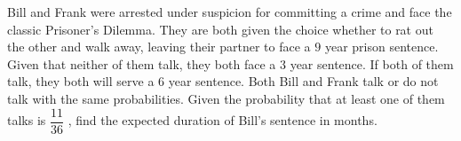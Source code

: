 Bill and Frank were arrested under suspicion for committing a crime and face the classic Prisoner's Dilemma. They are both given the choice whether to rat out the other and walk away, leaving their partner to face a $9$ year prison sentence. Given that neither of them talk, they both face a $3$ year sentence. If both of them talk, they both will serve a $6$ year sentence. Both Bill and Frank talk or do not talk with the same probabilities. Given the probability that at least one of them talks is $\dfrac{11}{36}$ , find the expected duration of Bill's sentence in months.

